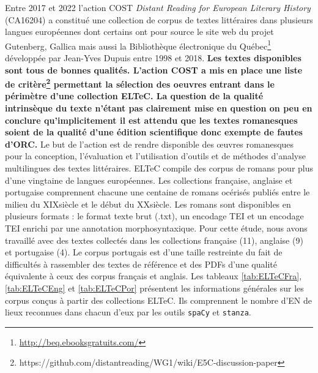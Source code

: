 Entre 2017 et 2022 l'action COST \textit{Distant Reading for European Literary History} (CA16204) a constitué une collection de corpus de textes littéraires dans plusieurs langues européennes dont certains ont pour source le site web du projet Gutenberg, Gallica mais aussi la Bibliothèque électronique du Québec\footnote{\url{http://beq.ebooksgratuits.com/}} développée par Jean-Yves Dupuis entre 1998 et 2018. \textbf{Les textes disponibles sont tous de bonnes qualités. L'action COST a mis en place une liste de critère\footnote{https://github.com/distantreading/WG1/wiki/E5C-discussion-paper} permettant la sélection des oeuvres entrant dans le périmètre d'une collection ELTeC. La question de la qualité intrinsèque du texte n'étant pas clairement mise en question on peu en conclure qu'implicitement il est attendu que les textes romanesques soient de la qualité d'une édition scientifique donc exempte de fautes d'ORC.} Le but de l'action est de rendre disponible des œuvres romanesques pour la conception, l'évaluation et l'utilisation d'outils et de méthodes d'analyse multilingues des textes littéraires. ELTeC compile des corpus de romans pour plus d'une vingtaine de langues européennes. Les collections française, anglaise et portugaise comprennent chacune une centaine de romans océrisés publiés entre le milieu du XIX\ieme{}siècle et le début du XX\ieme{}siècle. Les romans sont disponibles en plusieurs formats : le format texte brut (.txt), un encodage TEI et un encodage TEI enrichi par une annotation morphosyntaxique.
Pour cette étude, nous avons travaillé avec des textes collectés dans les collections française (11), anglaise (9) et portugaise (4). Le corpus portugais est d'une taille restreinte du fait de difficultés à rassembler des textes de référence et des PDFs d'une qualité équivalente à ceux des corpus français et anglais. Les tableaux \ref{tab:ELTeCFra}, \ref{tab:ELTeCEng} et \ref{tab:ELTeCPor} présentent les informations générales sur les corpus conçus à partir des collections ELTeC. Ils comprennent le nombre d'EN de lieux reconnues dans chacun d'eux par les outils \texttt{spaCy} et \texttt{stanza}.


